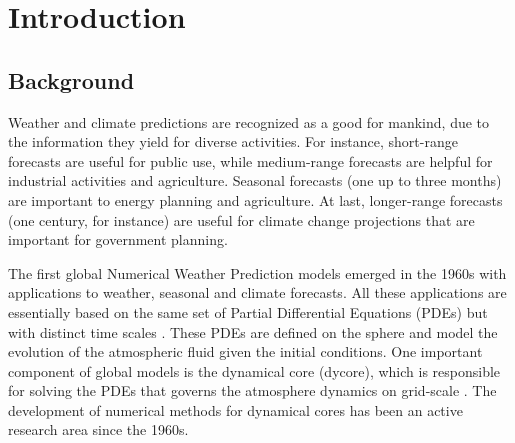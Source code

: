 

\chapter{Introduction}
\label{cap:introduction}

\enlargethispage{.5\baselineskip}

\section{Background}

Weather and climate predictions are recognized as a good for mankind,
due to the information they yield for diverse activities. 
For instance, short-range forecasts are useful for public use, while
medium-range forecasts are helpful for industrial activities and agriculture. 
Seasonal forecasts (one up to three months) are important to energy planning and agriculture.
At last, longer-range forecasts (one century, for instance) are useful for climate change 
projections that are important for government planning.

The first global Numerical Weather Prediction models emerged in the 1960s
with applications to weather, seasonal and climate forecasts. 
All these applications are essentially based on the same set of Partial Differential Equations
(PDEs) but with distinct time scales \citep{stan:2008}. These PDEs are defined on the sphere
and model the evolution of the atmospheric fluid given the initial conditions.
One important component of global models is the dynamical core (dycore), which is responsible
for solving the PDEs that governs the atmosphere dynamics on grid-scale \citep{will:2007}. 
The development of numerical methods for dynamical cores has been an active research area since the 1960s.

